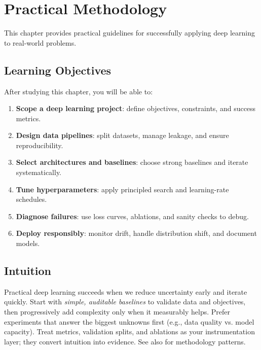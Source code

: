 
\chapter{Practical Methodology}
\label{chap:practical-methodology}

This chapter provides practical guidelines for successfully applying deep learning to real-world problems.


\section*{Learning Objectives}

After studying this chapter, you will be able to:

\begin{enumerate}
    \item \textbf{Scope a deep learning project}: define objectives, constraints, and success metrics.
    \item \textbf{Design data pipelines}: split datasets, manage leakage, and ensure reproducibility.
    \item \textbf{Select architectures and baselines}: choose strong baselines and iterate systematically.
    \item \textbf{Tune hyperparameters}: apply principled search and learning-rate schedules.
    \item \textbf{Diagnose failures}: use loss curves, ablations, and sanity checks to debug.
    \item \textbf{Deploy responsibly}: monitor drift, handle distribution shift, and document models.
\end{enumerate}


\section*{Intuition}

Practical deep learning succeeds when we reduce uncertainty early and iterate quickly. Start with \emph{simple, auditable baselines} to validate data and objectives, then progressively add complexity only when it measurably helps. Prefer experiments that answer the biggest unknowns first (e.g., data quality vs. model capacity). Treat metrics, validation splits, and ablations as your instrumentation layer; they convert intuition into evidence. See also \textcite{GoodfellowEtAl2016} for methodology patterns.












